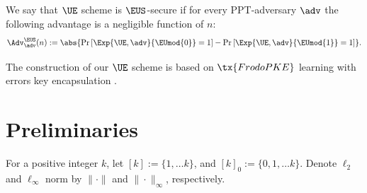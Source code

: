 \documentclass{fundam}
\begin{document}
\begin{pchstack}[center]
	
	\pchspace
	
	\hspace{2cm}
	
	\pchspace
\end{pchstack}

\vspace{0.1cm}
We say that $\UE$ scheme is $\EUS$-secure if for every PPT-adversary $\adv$ the following advantage is a negligible function of $n$:
\begin{align*}
	\Adv_{\adv}^{\EUS}(n):=\abs{\Pr\left[ \Exp{\UE,\adv}{\EUmod{0}} =1 \right] - \Pr\left[ \Exp{\UE,\adv}{\EUmod{1}} =1 \right]}.
\end{align*}

\vspace{0.3cm}
\noindent
The construction of our $\UE$ scheme is based on $\tx{FrodoPKE}$ learning with errors key encapsulation \cite{Frodo}.

\section{Preliminaries}
For a positive integer $k$, let $[k]:=\{1,\ldots k\}$, and $[k]_{0}:=\{0,1,\ldots k\}$. Denote $\ell_{2}$ and $\ell_{\infty}$ norm by $\|\cdot\|$ and $\|\cdot\|_{\infty}$, respectively. 
\end{document}
